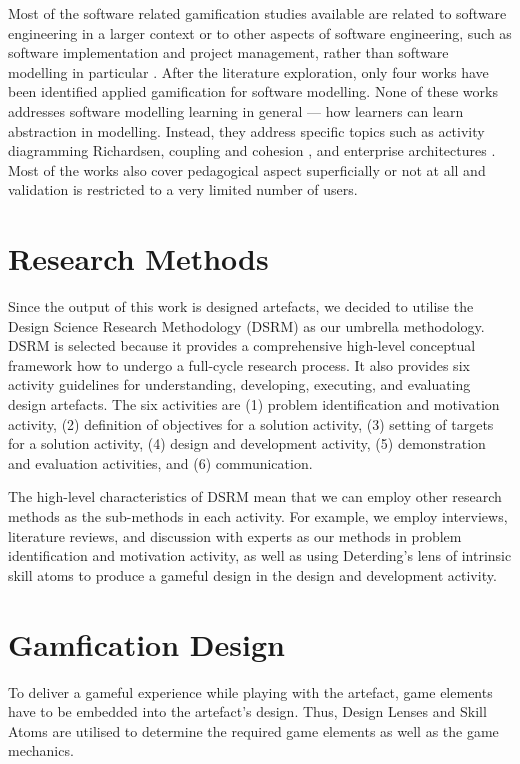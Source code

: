 \documentclass[runningheads,a4paper]{llncs}
\begin{document}
Most of the software related gamification studies available are related to software engineering in a larger context or to other aspects of software engineering, such as software implementation and project management, rather than software modelling in particular \cite{Pedreira2015}. After the literature exploration, only four works have been identified applied gamification for software modelling. None of these works addresses software modelling learning in general --- how learners can learn abstraction in modelling. Instead, they address specific topics such as activity diagramming Richardsen\cite{Richardsen2014}, coupling and cohesion \cite{Stikkolorum2014}, and enterprise architectures \cite{Groenewegen2010} \cite{Ionita2015}. Most of the works also cover pedagogical aspect superficially or not at all and validation is restricted to a very limited number of users.

\section{Research Methods}
Since the output of this work is designed artefacts, we decided to utilise the Design Science Research Methodology (DSRM) \cite{peffers2007design} as our umbrella methodology. DSRM is selected because it provides a comprehensive high-level conceptual framework how to undergo a full-cycle research process. It also provides six activity guidelines for understanding, developing, executing, and evaluating design artefacts. The six activities are (1) problem identification and motivation activity, (2) definition of objectives for a solution activity, (3) setting of targets for a solution activity, (4) design and development activity, (5) demonstration and evaluation activities, and (6) communication. 

The high-level characteristics of DSRM mean that we can employ other research methods as the sub-methods in each activity. For example, we employ interviews, literature reviews, and discussion with experts as our methods in problem identification and motivation activity, as well as using Deterding's lens of intrinsic skill atoms \cite{deterding2015lens} to produce a gameful design in the design and development activity.

\section{Gamfication Design}
To deliver a gameful experience while playing with the artefact, game elements have to be embedded into the artefact's design. Thus, Design Lenses and Skill Atoms \cite{deterding2015lens} are utilised to determine the required game elements as well as the game mechanics. 
\end{document}
